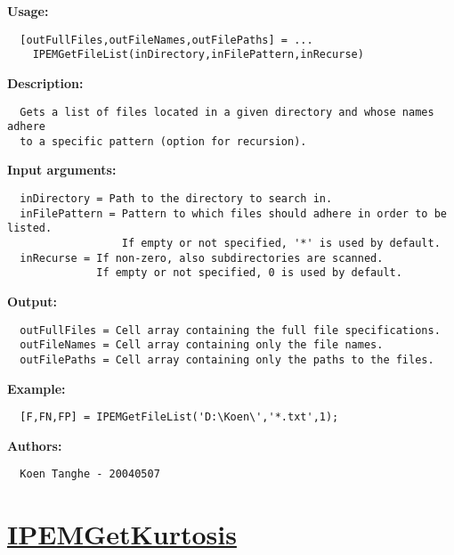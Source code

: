\textbf{Usage:}
\begin{verbatim}  [outFullFiles,outFileNames,outFilePaths] = ...
    IPEMGetFileList(inDirectory,inFilePattern,inRecurse)

\end{verbatim}
\textbf{Description:}
\begin{verbatim}  Gets a list of files located in a given directory and whose names adhere
  to a specific pattern (option for recursion).

\end{verbatim}
\textbf{Input arguments:}
\begin{verbatim}  inDirectory = Path to the directory to search in.
  inFilePattern = Pattern to which files should adhere in order to be listed.
                  If empty or not specified, '*' is used by default.
  inRecurse = If non-zero, also subdirectories are scanned.
              If empty or not specified, 0 is used by default.

\end{verbatim}
\textbf{Output:}
\begin{verbatim}  outFullFiles = Cell array containing the full file specifications.
  outFileNames = Cell array containing only the file names.
  outFilePaths = Cell array containing only the paths to the files.

\end{verbatim}
\textbf{Example:}
\begin{verbatim}  [F,FN,FP] = IPEMGetFileList('D:\Koen\','*.txt',1);

\end{verbatim}
\textbf{Authors:}
\begin{verbatim}  Koen Tanghe - 20040507
\end{verbatim}


\newpage
\section*{\hyperlink{Concepts:IPEMGetKurtosis}{IPEMGetKurtosis}}
\hypertarget{FuncRef:IPEMGetKurtosis}{}


